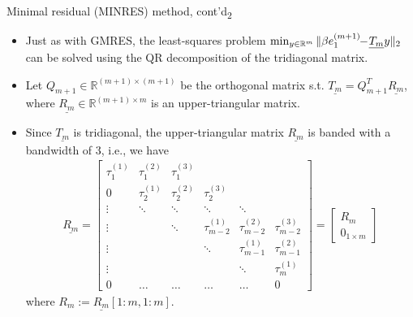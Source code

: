 \documentclass[t,usepdftitle=false]{beamer}
\begin{document}
\begin{frame}{Minimal residual (MINRES) method, cont'd\textsubscript{2}}
\begin{itemize}
\item Just as with GMRES, the least-squares problem $\min_{y\in\mathbb{R}^m}\|\beta e_1^{(m+1)}\!\!-\!\underline{T_m}y\|_2\hspace{-1cm}$\\
can be solved using the QR decomposition of the tridiagonal matrix.
\item[] Let $Q_{m+1}\in\mathbb{R}^{(m+1)\times(m+1)}$ be the orthogonal matrix s.t. $\underline{T_m}=Q_{m+1}^T\underline{R_m}$, where $\underline{R_m}\in\mathbb{R}^{(m+1)\times m}$ is an upper-triangular matrix.
\item[] Since $\underline{T_m}$ is tridiagonal, the upper-triangular matrix $\underline{R_m}$ is banded with a bandwidth of 3, i.e., we have
\begin{align*}
\underline{R_m}=
\begin{bmatrix}
\tau_1^{(1)}&\tau_1^{(2)}&\tau_1^{(3)}\\
0&\tau_2^{(1)}&\tau_2^{(2)}&\tau_2^{(3)}\\
\vdots&\ddots&\ddots&\ddots&\ddots\\
\vdots&&\ddots&\tau_{m-2}^{(1)}&\tau_{m-2}^{(2)}&\tau_{m-2}^{(3)}\\
\vdots&&&\ddots&\tau_{m-1}^{(1)}&\tau_{m-1}^{(2)}\\
\vdots&&&&\ddots&\tau_{m}^{(1)}\\
0&\dots&\dots&\dots&\dots&0
\end{bmatrix}
=
\begin{bmatrix}
R_m\\
0_{1\times m}
\end{bmatrix}
\end{align*}
where $R_m:=\underline{R_{m}}[1\!:\!m,1\!:\!m]$.
\end{itemize}
\end{frame}
\end{document}
